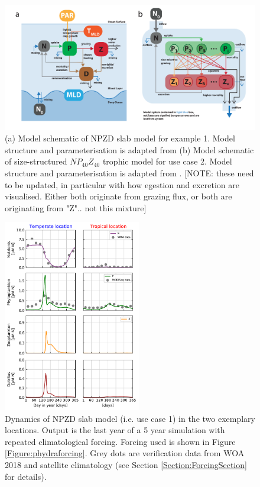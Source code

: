 \documentclass[journal abbreviations, manuscript]{copernicus}
\begin{document}
\begin{figure}[t]
\includegraphics[width=15cm]{Figures/firstdraft_schematics/02__schematics_NPZDandChemostat.pdf}
\caption{(a) Model schematic of NPZD slab model for example 1. Model structure and parameterisation is adapted
from \citet{Anderson2015c} (b) Model schematic of size-structured $NP_{40}Z_{40}$ trophic model for use case 2. Model structure and parameterisation is adapted from \citet{Banas2011b}. [NOTE: these need to be updated, in particular with how egestion and excretion are visualised. Either both originate from grazing flux, or both are originating from "Z".. not this mixture]}
\label{Figure:phydraschematics_1}
\end{figure}


\begin{figure}[t]
\includegraphics[width=6cm]{Figures/firstdraft_plots/02_NPZDslab.pdf}
\caption{Dynamics of NPZD slab model (i.e. use case 1) in the two exemplary locations. Output is the last year of a 5 year simulation with repeated climatological forcing. Forcing used is shown in Figure \ref{Figure:phydraforcing}. Grey dots are verification data from WOA 2018 and satellite climatology (see Section \ref{Section:ForcingSection} for details).}
\label{Figure:NPZDslab_results}
\end{figure}
\end{document}
